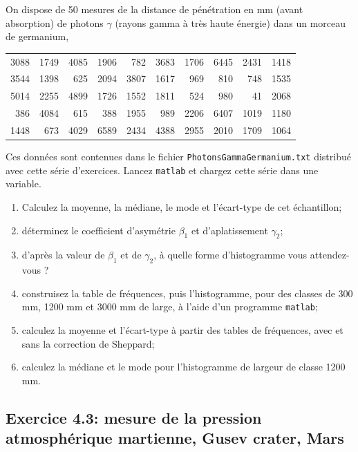 \documentclass[main.tex]{subfiles}
\begin{document}
On dispose de 50 mesures de la distance de pénétration en mm (avant absorption) de photons $\gamma$ (rayons gamma à très haute énergie) dans un morceau de germanium,
\begin{center}
    \begin{tabular}{|r|r|r|r|r|r|r|r|r|r|}
        3088 & 1749 & 4085 & 1906 & 782  & 3683 & 1706 & 6445 & 2431 & 1418 \\
        3544 & 1398 & 625  & 2094 & 3807 & 1617 & 969  & 810  & 748  & 1535 \\
        5014 & 2255 & 4899 & 1726 & 1552 & 1811 & 524  & 980  & 41   & 2068 \\
        386  & 4084 & 615  & 388  & 1955 & 989  & 2206 & 6407 & 1019 & 1180 \\
        1448 & 673  & 4029 & 6589 & 2434 & 4388 & 2955 & 2010 & 1709 & 1064
    \end{tabular}
\end{center}
Ces données sont contenues dans le fichier \texttt{PhotonsGammaGermanium.txt} distribué avec cette série d'exercices. Lancez \texttt{matlab} et chargez cette série dans une variable.
\begin{enumerate}
    \item Calculez la moyenne, la médiane, le mode et l'écart-type de cet échantillon;
    \item déterminez le coefficient d'asymétrie $\beta_1$ et d'aplatissement $\gamma_2$;
    \item d'après la valeur de $\beta_1$ et de $\gamma_2$, à quelle forme d'histogramme vous attendez-vous ?
    \item construisez la table de fréquences, puis l'histogramme, pour des classes de 300 mm, 1200 mm et 3000 mm de large, à l'aide d'un programme \texttt{matlab};
    \item calculez la moyenne et l'écart-type à partir des tables de fréquences, avec et sans la correction de Sheppard;
    \item calculez la médiane et le mode pour l'histogramme de largeur de classe 1200 mm.
\end{enumerate}

\subsection{Exercice 4.3: mesure de la pression atmosphérique martienne, Gusev crater, Mars}
\end{document}

